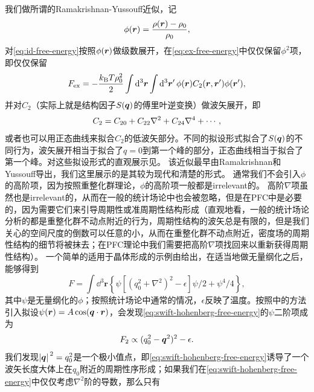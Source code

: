 \documentclass[hyperref, UTF8, a4paper]{ctexart}
\begin{document}
我们做所谓的Ramakrishnan-Yussouff近似，记
\begin{equation}
    \phi(\vb*{r}) = \frac{\rho(\vb*{r}) - \rho_0}{\rho_0},
\end{equation}
对\eqref{eq:id-free-energy}按照$\phi(\vb*{r})$做级数展开，在\eqref{eq:ex-free-energy}中仅仅保留$\phi^2$项，即仅仅保留
\begin{equation}
    F_\text{ex} = - \frac{k_\text{B} T \rho^2_0}{2} \int \dd[3]{\vb*{r}} \int \dd[3]{\vb*{r}'} {\phi(\vb*{r})} C_2(\vb*{r}, \vb*{r}') {\phi(\vb*{r}')}, 
\end{equation}
并对$C_2$（实际上就是结构因子$S(\vb*{q})$的傅里叶逆变换）做波矢展开，即
\begin{equation}
    C_2 = C_{20} + C_{22} \laplacian + C_{24} \nabla^4 + \cdots,
\end{equation}
或者也可以用正态曲线来拟合$C_2$的低波矢部分。不同的拟设形式拟合了$S(\vb*{q})$的不同行为，波矢展开相当于拟合了$q=0$到第一个峰的部分，正态曲线相当于拟合了第一个峰。对这些拟设形式的直观展示见。
该近似最早由Ramakrishnan和Yussouff导出\cite{PhysRevB.19.2775,Singh1991351}，我们这里展示的是其较为现代和清楚的形式\cite{pfc2009}。
通常我们不会引入$\phi$的高阶项，因为按照重整化群理论，$\phi$的高阶项一般都是irrelevant的\cite{kardar2007statistical}。
高阶$\nabla$项虽然也是irrelevant的，从而在一般的统计场论中也会被忽略，但是在PFC中是必要的，因为需要它们来引导周期性或准周期性结构形成（直观地看，一般的统计场论分析的都是重整化群不动点附近的行为，周期性结构的波矢总是有限的，但是我们关心的空间尺度的倒数可以任意的小，从而在重整化群不动点附近，密度场的周期性结构的细节将被抹去；在PFC理论中我们需要把高阶$\nabla$项找回来以重新获得周期性结构）。
一个简单的适用于晶体形成的示例由\cite{PhysRevLett.88.245701}给出，在适当地做无量纲化之后，能够得到
\begin{equation}
    F = \int \dd^3 \boldsymbol{r}\left\{\psi\left[\left(q_{0}^{2}+\nabla^{2}\right)^{2}-\epsilon\right] \psi / 2+\psi^{4} / 4\right\},
    \label{eq:swift-hohenberg-free-energy}
\end{equation}
其中$\psi$是无量纲化的$\phi$；按照统计场论中通常的情况，$\epsilon$反映了温度\cite{kardar2007statistical}。按照\cite{PhysRevE.70.051605}中的方法引入拟设$\psi(\vb*{r}) = A \cos(\vb*{q} \cdot \vb*{r})$，会发现\eqref{eq:swift-hohenberg-free-energy}的$\psi$二阶项成为
\[
    F_2 \propto (q_0^2 - \vb*{q}^2)^2 - \epsilon.
\]
我们发现$\abs*{\vb*{q}}^2 = q_0^2$是一个极小值点，即\eqref{eq:swift-hohenberg-free-energy}诱导了一个波矢长度大体上在$q_0$附近的周期性序形成；如果我们在\eqref{eq:swift-hohenberg-free-energy}中仅仅考虑$\nabla^2$阶的导数，那么只有
\end{document}
